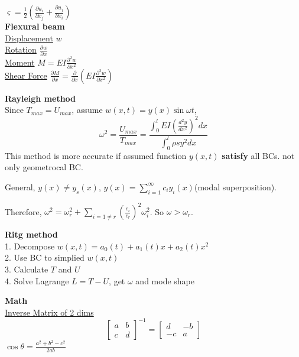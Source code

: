 \documentclass{article}
\begin{document}
\begin{multicols*}{3}
  $\varsigma=\frac{1}{2}(\frac{\partial u_{i}}{\partial x_{j}}+\frac{\partial u_{j}}{\partial x_{i}})$\\

  \noindent\textbf{Flexural beam}\\
  \underline{Displacement} $w$\\
  \underline{Rotation} $\frac{\partial w}{\partial x}$\\
  \underline{Moment} $M=EI\frac{\partial^{2} w}{\partial x^{2}}$\\
  \underline{Shear Force} $\frac{\partial M}{\partial x}=\frac{\partial }{\partial x}(EI \frac{\partial^{2}w}{\partial x^{2}})$

  \noindent\textbf{Rayleigh method}\\
  Since $T_{max} = U_{max}$, assume $w(x,t) = y(x) \sin\omega t$,
      \begin{equation*}
        \omega^2 =\frac{U_{max}}{T_{max}}=\frac{\int_0^l EI(\frac{d^2y}{dx^2})^2 dx}{\int_0^l \rho s y^2 dx}
      \end{equation*}
  This method is more accurate if assumed function $y(x,t)$ \textbf{satisfy} all BCs. not only geometrocal BC.

  General, $y(x)\neq y_{s}(x)$,  $y(x)=\sum_{i=1}^{\infty}c_{i}y_{i}(x)$(modal superposition).
  
  Therefore, $\omega^{2}=\omega^{2}_{r}+\sum_{i=1\neq r}(\frac{c_{i}}{c_{r}})^{2}\omega_{i}^{2}$. So $\omega>\omega_{r}$.
  
  \noindent\textbf{Ritg method}\\
  1. Decompose $w(x,t) = a_0(t) + a_1(t)x + a_2(t)x^2$\\
  2. Use BC to simplied $w(x,t)$ \\
  3. Calculate $T$ and $U$\\
  4. Solve Lagrange $L = T - U$, get $\omega$ and mode shape

  \noindent\textbf{Math}\\
  \underline{Inverse Matrix of 2 dims}
  \begin{equation*}
    \begin{bmatrix}
      a & b \\
      c & d
    \end{bmatrix}^{-1} =
    \begin{bmatrix}
      d & -b \\
      -c & a
    \end{bmatrix}
  \end{equation*}
  $\cos\theta = \frac{a^2+b^2-c^2}{2ab}$\\


\end{multicols*}
\end{document}
